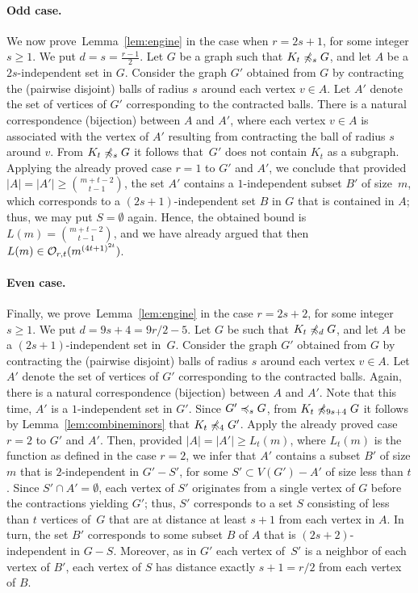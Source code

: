 \paragraph{Odd case.}
We now prove~Lemma~\ref{lem:engine} in the case when $r=2s+1$, for
some integer $s\geq 1$. We put $d=s=\frac{r-1}{2}$.  Let $G$ be a
graph such that $K_t\not\preccurlyeq_s G$, and let $A$ be a $2s$-independent
set in $G$. Consider the graph $G'$ obtained from $G$ by contracting
the (pairwise disjoint) balls of radius $s$ around each vertex
$v\in A$.  Let $A'$ denote the set of vertices of $G'$ corresponding
to the contracted balls. There is a natural correspondence (bijection)
between $A$ and $A'$, where each vertex $v\in A$ is associated with
the vertex of $A'$ resulting from contracting the ball of radius $s$
around $v$.  From $K_t\not\preccurlyeq_s G$ it follows that~$G'$ does not
contain $K_t$ as a subgraph. Applying the already proved case $r=1$ to
$G'$ and $A'$, we conclude that provided
$|A|=|A'|\ge {m+t-2\choose t-1}$, the set $A'$ contains a
$1$-independent subset $B'$ of size~$m$, which corresponds to a
$(2s+1)$-independent set $B$ in $G$ that is contained in $A$; thus, we
may put $S=\emptyset$ again.  Hence, the obtained bound is
$L(m)={m+t-2\choose t-1}$, and we have already argued that then
$L(m)\in \mathcal{O}_{r,t}{(m^{{(4t+1)}^{2t}})}$.
 
 
 \paragraph{Even case.}
 Finally, we prove~Lemma~\ref{lem:engine} in the case $r=2s+2$, for
 some integer $s\geq 1$. We put $d=9s+4=9r/2-5$.  Let $G$ be such that
 $K_t\not\preccurlyeq_{d} G$, and let $A$ be a $(2s+1)$-independent set
 in~$G$. Consider the graph $G'$ obtained from $G$ by contracting the
 (pairwise disjoint) balls of radius $s$ around each vertex $v\in A$.
 Let $A'$ denote the set of vertices of $G'$ corresponding to the
 contracted balls. Again, there is a natural correspondence
 (bijection) between $A$ and $A'$. Note that this time, $A'$ is a
 $1$-independent set in $G'$.  Since $G'\preccurlyeq_s G$, from
 $K_t\not\preccurlyeq_{9s+4} G$ it follows by Lemma~\ref{lem:combineminors}
 that $K_t\not\preccurlyeq_4 G'$. Apply the already proved case $r=2$ to
 $G'$ and $A'$.  Then, provided $|A|=|A'|\ge L_t(m)$, where $L_t(m)$
 is the function as defined in the case $r=2$, we infer that $A'$
 contains a subset $B'$ of size $m$ that is $2$-independent in
 $G'-S'$, for some $S'\subset V(G')-A'$ of size less than $t$.  Since
 $S'\cap A'=\emptyset$, each vertex of $S'$ originates from a single
 vertex of $G$ before the contractions yielding $G'$; thus, $S'$
 corresponds to a set $S$ consisting of less than $t$ vertices of~$G$
 that are at distance at least $s+1$ from each vertex in $A$.  In
 turn, the set $B'$ corresponds to some subset $B$ of $A$ that is
 $(2s+2)$-independent in $G-S$. Moreover, as in $G'$ each vertex
 of~$S'$ is a neighbor of each vertex of $B'$, each vertex of $S$ has
 distance exactly $s+1=r/2$ from each vertex of $B$.

